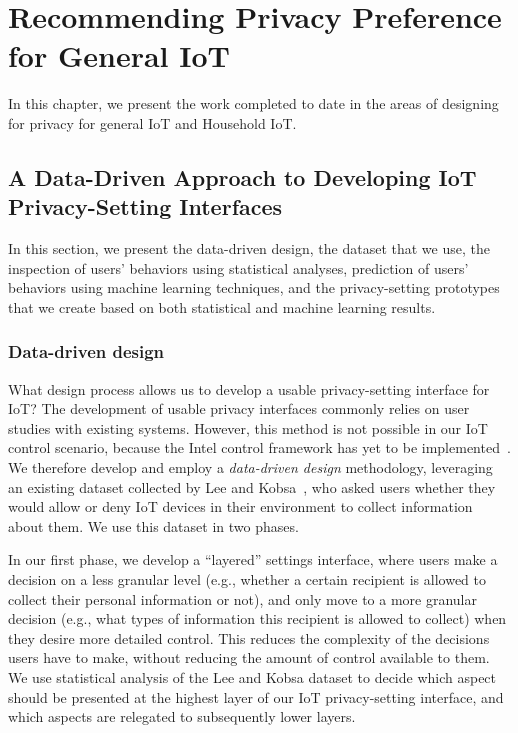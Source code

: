 \chapter{Recommending Privacy Preference for General IoT}
In this chapter, we present the work completed to date in the areas of designing for privacy for general IoT and Household IoT.

\section{A Data-Driven Approach to Developing IoT Privacy-Setting Interfaces}
In this section, we present the data-driven design, the dataset that we use, the inspection of users' behaviors using statistical analyses, prediction of users' behaviors using machine learning techniques, and the privacy-setting prototypes that we create based on both statistical and machine learning results.

\subsection{Data-driven design}
What design process allows us to develop a usable privacy-setting interface for IoT? The development of usable privacy interfaces commonly relies on user studies with existing systems. However, this method is not possible in our IoT control scenario, because the Intel control framework has yet to be implemented~\cite{chow2015hci}. We therefore develop and employ a \emph{data-driven design} methodology, leveraging an existing dataset collected by Lee and Kobsa~\cite{lee2016understanding}, who asked users whether they would allow or deny IoT devices in their environment to collect information about them. We use this dataset in two phases. 

In our first phase, we develop a ``layered'' settings interface, where users make a decision on a less granular level (e.g., whether a certain recipient is allowed to collect their personal information or not), and only move to a more granular decision (e.g., what types of information this recipient is allowed to collect) when they desire more detailed control. This reduces the complexity of the decisions users have to make, without reducing the amount of control available to them. We use statistical analysis of the Lee and Kobsa dataset to decide which aspect should be presented at the highest layer of our IoT privacy-setting interface, and which aspects are relegated to subsequently lower layers.

